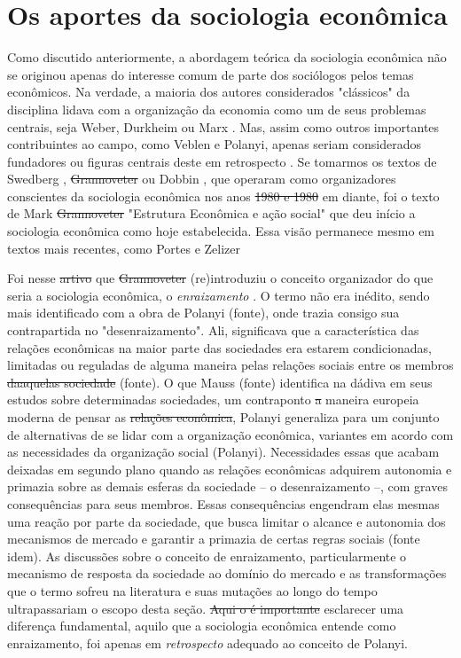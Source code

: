 \section{Os aportes da sociologia econômica}
Como discutido anteriormente, a abordagem teórica da 
sociologia econômica não se originou apenas do interesse
comum de parte dos sociólogos pelos temas econômicos.
Na verdade, a maioria dos autores considerados "clássicos" da disciplina lidava com a organização da economia como um de seus problemas centrais, seja Weber, Durkheim ou Marx . Mas, assim como outros importantes contribuintes ao campo, como Veblen e Polanyi,
apenas seriam considerados fundadores ou figuras centrais deste em
retrospecto . Se tomarmos os textos de Swedberg
, \sout{Grannoveter}  ou Dobbin , que operaram como organizadores conscientes da sociologia econômica nos anos \sout{1980 e 1980} em diante, foi o texto de Mark \sout{Grannoveter} "Estrutura Econômica e ação social"  que deu início a sociologia econômica como hoje estabelecida. Essa visão permanece mesmo em textos mais recentes, como Portes e Zelizer 

Foi nesse \sout{artivo} que \sout{Grannoveter} (re)introduziu o conceito organizador do que
seria a sociologia econômica, o \emph{enraizamento} . O termo não era inédito, sendo mais identificado com a obra de Polanyi (fonte), onde trazia consigo sua contrapartida no
"desenraizamento". Ali, significava que a característica das relações econômicas na maior parte das sociedades era estarem condicionadas, limitadas
ou reguladas de alguma maneira pelas relações sociais entre os membros
\sout{daaquelas sociedade} (fonte). O que Mauss (fonte) identifica na dádiva
em seus estudos sobre determinadas sociedades, um contraponto
\sout{a} maneira europeia moderna de pensar as \sout{relações econômica}, 
Polanyi generaliza para um conjunto de alternativas de se lidar com
a organização econômica, variantes em acordo com as necessidades da
organização social (Polanyi). Necessidades essas que acabam deixadas
em segundo plano quando as relações econômicas adquirem autonomia
e primazia sobre as demais esferas da sociedade -- o desenraizamento --, com graves consequências para seus membros. Essas consequências engendram elas mesmas uma reação por parte da sociedade, que busca limitar o alcance e autonomia dos mecanismos de mercado e garantir a primazia de certas regras sociais (fonte idem).
As discussões sobre o conceito de enraizamento, particularmente o mecanismo de resposta da sociedade ao domínio do mercado  e as transformações que o termo sofreu na literatura e suas mutações ao longo do tempo  ultrapassariam o escopo desta seção. \sout{Aqui o é importante} esclarecer uma diferença fundamental, aquilo que a sociologia econômica entende como enraizamento, foi apenas em \emph{retrospecto} adequado ao conceito de Polanyi.

